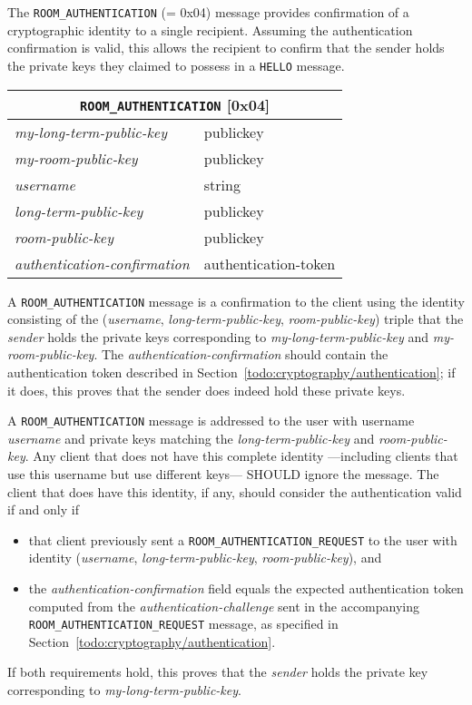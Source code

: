 \documentclass{article}
\def\message#1{\texttt{#1}}
\def\field#1{\textit{#1}}
\newenvironment{basicmessage}[2]{
\newcommand{\messagefield}[2]{
\field{##1} & \textsf{##2} \\
\hline
}
\begin{tabular}{|l|l|}
\hline
\multicolumn{2}{|c|}{\message{#1} [#2]} \\
\hline
\hline
}{
\end{tabular}
}
\begin{document}
The \message{ROOM\_AUTHENTICATION} (= 0x04) message provides confirmation of a cryptographic identity to a single recipient.
Assuming the authentication confirmation is valid, this allows the recipient to confirm that the sender holds the private keys they claimed to possess in a \message{HELLO} message.

\begin{basicmessage}{ROOM\_AUTHENTICATION}{0x04}
\messagefield{my-long-term-public-key}{publickey}
\messagefield{my-room-public-key}{publickey}
\messagefield{username}{string}
\messagefield{long-term-public-key}{publickey}
\messagefield{room-public-key}{publickey}
\messagefield{authentication-confirmation}{authentication-token}
\end{basicmessage}

A \message{ROOM\_AUTHENTICATION} message is a confirmation to the client using the identity consisting of the (\field{username}, \field{long-term-public-key}, \field{room-public-key}) triple that the \field{sender} holds the private keys corresponding to \field{my-long-term-public-key} and \field{my-room-public-key}.
The \emph{authentication-confirmation} should contain the authentication token described in Section~\ref{todo:cryptography/authentication}; if it does, this proves that the sender does indeed hold these private keys.

A \message{ROOM\_AUTHENTICATION} message is addressed to the user with username \field{username} and private keys matching the \field{long-term-public-key} and \field{room-public-key}.
Any client that does not have this complete identity ---including clients that use this username but use different keys--- SHOULD ignore the message.
The client that does have this identity, if any, should consider the authentication valid if and only if
\begin{itemize}
\item that client previously sent a \message{ROOM\_AUTHENTICATION\_REQUEST} to the user with identity (\field{username}, \field{long-term-public-key}, \field{room-public-key}), and
\item the \field{authentication-confirmation} field equals the expected authentication token computed from the \field{authentication-challenge} sent in the accompanying \message{ROOM\_AUTHENTICATION\_REQUEST} message, as specified in Section~\ref{todo:cryptography/authentication}.
\end{itemize}
If both requirements hold, this proves that the \field{sender} holds the private key corresponding to \field{my-long-term-public-key}.
\end{document}
